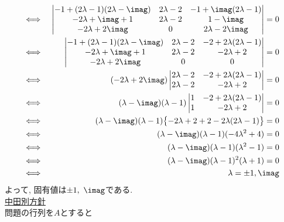 \begin{enumerate}[(1)]
\begin{eqnarray*}
        \Longleftrightarrow\ && 
        \begin{vmatrix}
            -1 + (2\lambda - 1)(2\lambda - \imag) & 2\lambda - 2 & -1 + \imag(2\lambda - 1)\\
            -2\lambda + \imag + 1 & 2\lambda - 2 & 1 - \imag\\
            -2\lambda + 2\imag & 0 & 2\lambda - 2\imag
        \end{vmatrix} = 0\\
        \Longleftrightarrow\ && 
        \begin{vmatrix}
            -1 + (2\lambda - 1)(2\lambda - \imag) & 2\lambda - 2 & -2 + 2\lambda(2\lambda - 1)\\
            -2\lambda + \imag + 1 & 2\lambda - 2 & -2\lambda + 2\\
            -2\lambda + 2\imag & 0 & 0
        \end{vmatrix} = 0\\
        \Longleftrightarrow\ && (-2\lambda + 2\imag)
        \begin{vmatrix}
            2\lambda - 2 & -2 + 2\lambda(2\lambda - 1)\\
            2\lambda - 2& -2\lambda + 2
        \end{vmatrix} = 0\\
        \Longleftrightarrow\ && (\lambda - \imag)(\lambda - 1)
        \begin{vmatrix}
            1 & -2 + 2\lambda(2\lambda - 1)\\
            1 & -2\lambda + 2
        \end{vmatrix} = 0\\
        \Longleftrightarrow\ && (\lambda - \imag)(\lambda - 1)\bigl\{-2\lambda + 2 + 2 - 2\lambda(2\lambda - 1)\bigr\} = 0\\
        \Longleftrightarrow\ && (\lambda - \imag)(\lambda - 1)(-4\lambda^{2} + 4) = 0\\
        \Longleftrightarrow\ && (\lambda - \imag)(\lambda - 1)(\lambda^{2} - 1) = 0\\
        \Longleftrightarrow\ && (\lambda - \imag)(\lambda - 1)^{2}(\lambda + 1) = 0\\
        \Longleftrightarrow\ && \lambda = \pm 1,\imag
    \end{eqnarray*}
    よって, 固有値は$\pm 1,\ \imag$である.\\
    \underline{中田別方針}\\
    問題の行列を$A$とすると
    \begin{eqnarray*}

\end{eqnarray*}
\end{enumerate}
